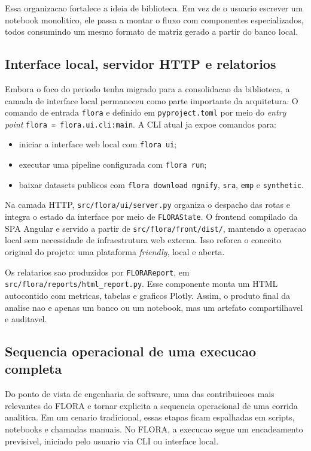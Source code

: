 \documentclass[12pt,a4paper]{article}
\begin{document}
Essa organizacao fortalece a ideia de biblioteca. Em vez de o usuario escrever um notebook monolitico, ele passa a montar o fluxo com componentes especializados, todos consumindo um mesmo formato de matriz gerado a partir do banco local.

\subsection{Interface local, servidor HTTP e relatorios}

Embora o foco do periodo tenha migrado para a consolidacao da biblioteca, a camada de interface local permaneceu como parte importante da arquitetura. O comando de entrada \texttt{flora} e definido em \texttt{pyproject.toml} por meio do \textit{entry point} \texttt{flora = flora.ui.cli:main}. A CLI atual ja expoe comandos para:

\begin{itemize}[leftmargin=1.5cm]
    \item iniciar a interface web local com \texttt{flora ui};
    \item executar uma pipeline configurada com \texttt{flora run};
    \item baixar datasets publicos com \texttt{flora download mgnify}, \texttt{sra}, \texttt{emp} e \texttt{synthetic}.
\end{itemize}

Na camada HTTP, \texttt{src/flora/ui/server.py} organiza o despacho das rotas e integra o estado da interface por meio de \texttt{FLORAState}. O frontend compilado da SPA Angular e servido a partir de \texttt{src/flora/front/dist/}, mantendo a operacao local sem necessidade de infraestrutura web externa. Isso reforca o conceito original do projeto: uma plataforma \textit{friendly}, local e aberta.

Os relatarios sao produzidos por \texttt{FLORAReport}, em \texttt{src/flora/reports/html\_report.py}. Esse componente monta um HTML autocontido com metricas, tabelas e graficos Plotly. Assim, o produto final da analise nao e apenas um banco ou um notebook, mas um artefato compartilhavel e auditavel.

\subsection{Sequencia operacional de uma execucao completa}

Do ponto de vista de engenharia de software, uma das contribuicoes mais relevantes do FLORA e tornar explicita a sequencia operacional de uma corrida analitica. Em um cenario tradicional, essas etapas ficam espalhadas em scripts, notebooks e chamadas manuais. No FLORA, a execucao segue um encadeamento previsivel, iniciado pelo usuario via CLI ou interface local.
\end{document}
